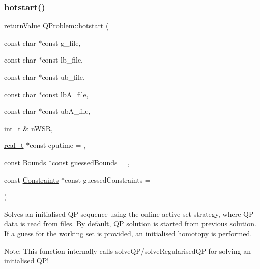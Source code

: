 \subsubsection{\texorpdfstring{hotstart()}{hotstart()}\hspace{0.1cm}{\footnotesize\ttfamily [2/2]}}
{\footnotesize\ttfamily \hyperlink{_message_handling_8hpp_a81d556f613bfbabd0b1f9488c0fa865e}{return\+Value} Q\+Problem\+::hotstart (\begin{DoxyParamCaption}\item[{const char $\ast$const}]{g\+\_\+file,  }\item[{const char $\ast$const}]{lb\+\_\+file,  }\item[{const char $\ast$const}]{ub\+\_\+file,  }\item[{const char $\ast$const}]{lb\+A\+\_\+file,  }\item[{const char $\ast$const}]{ub\+A\+\_\+file,  }\item[{\hyperlink{_types_8hpp_ab6fd6105e64ed14a0c9281326f05e623}{int\+\_\+t} \&}]{n\+W\+SR,  }\item[{\hyperlink{qp_o_a_s_e_s__wrapper_8h_a0d00e2b3dfadee81331bbb39068570c4}{real\+\_\+t} $\ast$const}]{cputime = {},  }\item[{const \hyperlink{class_bounds}{Bounds} $\ast$const}]{guessed\+Bounds = {},  }\item[{const \hyperlink{class_constraints}{Constraints} $\ast$const}]{guessed\+Constraints = {} }\end{DoxyParamCaption})}

Solves an initialised QP sequence using the online active set strategy, where QP data is read from files. By default, QP solution is started from previous solution. If a guess for the working set is provided, an initialised homotopy is performed.

Note\+: This function internally calls solve\+Q\+P/solve\+Regularised\+QP for solving an initialised Q\+P!

